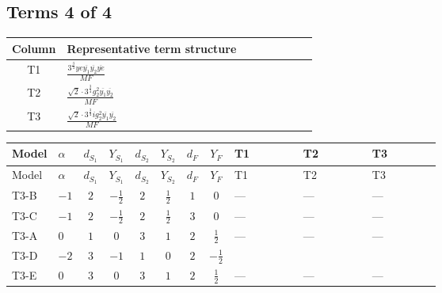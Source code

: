 \documentclass[8pt]{article}
\begin{document}
\begin{landscape}
\subsection*{Terms 4 of 4}
\begin{center}
\begin{tabular}{@{}c >{\raggedright\arraybackslash}p{0.82\linewidth}@{}}
\toprule
Column & Representative term structure \\
\midrule
T1 & \(\displaystyle \frac{3^{\frac{3}{4}} ye \overline{y_{1}} \overline{y_{2}} \overline{ye}}{MF}\) \\
\midrule
T2 & \(\displaystyle \frac{\sqrt{2} \cdot 3^{\frac{3}{4}} g_{2}^{2} \overline{y_{1}} \overline{y_{2}}}{MF}\) \\
\midrule
T3 & \(\displaystyle \frac{\sqrt{2} \cdot 3^{\frac{3}{4}} i g_{2}^{2} \overline{y_{1}} \overline{y_{2}}}{MF}\) \\
\midrule
\bottomrule
\end{tabular}
\end{center}
\smallskip
\tiny
\begin{longtable}{@{}llcccccc >{\raggedright\arraybackslash}p{0.21\linewidth} >{\raggedright\arraybackslash}p{0.21\linewidth} >{\raggedright\arraybackslash}p{0.21\linewidth}@{}}
\toprule
Model & $\alpha$ & $d_{S_1}$ & $Y_{S_1}$ & $d_{S_2}$ & $Y_{S_2}$ & $d_F$ & $Y_F$ & T1 & T2 & T3 \\
\midrule
\endfirsthead
\toprule
Model & $\alpha$ & $d_{S_1}$ & $Y_{S_1}$ & $d_{S_2}$ & $Y_{S_2}$ & $d_F$ & $Y_F$ & T1 & T2 & T3 \\
\midrule
\endhead
T3-B & $-1$ & $2$ & $-\frac{1}{2}$ & $2$ & $\frac{1}{2}$ & $1$ & $0$ & --- & --- & --- \\
\midrule
T3-C & $-1$ & $2$ & $-\frac{1}{2}$ & $2$ & $\frac{1}{2}$ & $3$ & $0$ & --- & --- & --- \\
\midrule
T3-A & $0$ & $1$ & $0$ & $3$ & $1$ & $2$ & $\frac{1}{2}$ & --- & --- & --- \\
\midrule
T3-D & $-2$ & $3$ & $-1$ & $1$ & $0$ & $2$ & $-\frac{1}{2}$ & \scriptsize\adjustbox{max width=\linewidth}{$\begin{gathered} - \frac{3^{\frac{3}{4}} ye \overline{y_{1}} \overline{y_{2}} \overline{ye}}{12 MF}\end{gathered}$} & \scriptsize\adjustbox{max width=\linewidth}{$\begin{gathered} \frac{\sqrt{2} \cdot 3^{\frac{3}{4}} g_{2}^{2} \overline{y_{1}} \overline{y_{2}}}{6 MF}\end{gathered}$} & \scriptsize\adjustbox{max width=\linewidth}{$\begin{gathered} \frac{\sqrt{2} \cdot 3^{\frac{3}{4}} i g_{2}^{2} \overline{y_{1}} \overline{y_{2}}}{6 MF}\end{gathered}$} \\
\midrule
T3-E & $0$ & $3$ & $0$ & $3$ & $1$ & $2$ & $\frac{1}{2}$ & --- & --- & --- \\
\midrule
\bottomrule
\end{longtable}
\clearpage

\end{landscape}
\end{document}
